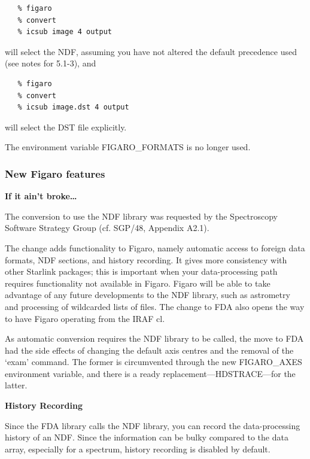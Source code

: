 \begin{enumerate}
\begin{verbatim}
   % figaro
   % convert
   % icsub image 4 output
\end{verbatim}

      will select the NDF, assuming you have not altered the default
      precedence used (see notes for 5.1-3), and

\begin{verbatim}
   % figaro
   % convert
   % icsub image.dst 4 output
\end{verbatim}

      will select the DST file explicitly.

      The environment variable FIGARO\_FORMATS is no longer used.
\end{enumerate}

\subsubsection{\label{news514_new_features}New Figaro features}

{\bf If it ain't broke\ldots}

   The conversion to use the NDF library was requested by the
   Spectroscopy Software Strategy Group (cf. SGP/48, Appendix
   A2.1).

   The change adds functionality to Figaro, namely automatic
   access to foreign data formats, NDF sections, and history
   recording.  It gives more consistency with other Starlink
   packages; this is important when your data-processing path
   requires functionality not available in Figaro.  Figaro will be
   able to take advantage of any future developments to the NDF
   library, such as astrometry and processing of wildcarded lists
   of files.  The change to FDA also opens the way to have Figaro
   operating from the IRAF cl.

   As automatic conversion requires the NDF library to be called,
   the move to FDA had the side effects of changing the default
   axis centres and the removal of the `exam' command.  The former
   is circumvented through the new FIGARO\_AXES environment
   variable, and there is a ready replacement---HDSTRACE---for the
   latter.


{\bf    History Recording}

   Since the FDA library calls the NDF library, you can record the
   data-processing history of an NDF.  Since the information can
   be bulky compared to the data array, especially for a spectrum,
   history recording is disabled by default.

